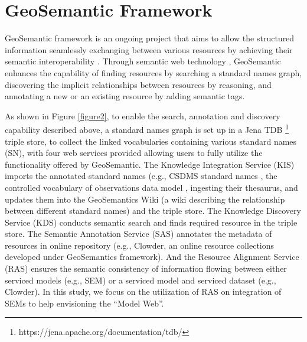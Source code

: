 \documentclass[review]{elsarticle}
\begin{document}
\section{GeoSemantic Framework}GeoSemantic framework is an ongoing project that aims to allow the structured information seamlessly exchanging between various resources by achieving their semantic interoperability \citep{elag2015}. Through semantic web technology \citep{berners2001}, GeoSemantic enhances the capability of finding resources by searching a standard names graph, discovering the implicit relationships between resources by reasoning, and annotating a new or an existing resource by adding semantic tags.

As shown in Figure \ref{figure2}, to enable the search, annotation and discovery capability described above, a standard names graph is set up in a Jena TDB \footnote{https://jena.apache.org/documentation/tdb/} triple store,  to collect the linked vocabularies containing various standard names (SN), with four web services provided allowing users to fully utilize the functionality offered by GeoSemantic. The Knowledge Integration Service (KIS) imports the annotated standard names (e.g., CSDMS standard names \citep{peckham2014CSN}, the controlled vocabulary of observations data model \citep{horsburgh2009}, ingesting their thesaurus, and updates them into the GeoSemantics Wiki (a wiki describing the relationship between different standard names) and the triple store. The Knowledge Discovery Service (KDS) conducts semantic search and finds required resource in the triple store. The Semantic Annotation Service (SAS) annotates the metadata of resources in online repository (e.g., Clowder, an online resource collections developed under GeoSemantics framework). And the Resource Alignment Service (RAS) ensures the semantic consistency of information flowing between either serviced models (e.g., SEM) or a serviced model and serviced dataset (e.g.,  Clowder). In this study, we focus on the utilization of RAS on integration of SEMs to help envisioning the “Model Web”.
\end{document}
